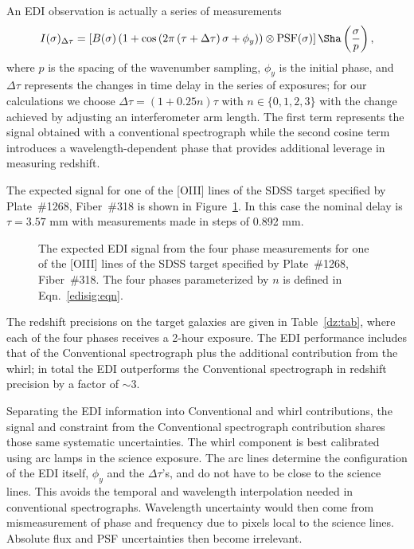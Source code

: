 \documentclass[preprint]{aastex}
\begin{document}
An EDI observation is actually a series of measurements
\begin{equation}
I(\sigma)_{\Delta\tau} = \left[B(\sigma)\left(1+\cos{\left(2\pi\left(\tau+\Delta \tau\right)\sigma+\phi_y \right)} \right)\otimes \mbox{PSF}(\sigma)\right]\Sha\left(\frac{\sigma}{p}\right),
\label{edisig:eqn}
\end{equation}
where $p$ is the spacing of the wavenumber sampling, $\phi_y$ is the initial phase,
and $\Delta \tau$ represents the changes in time delay in the series of exposures; for our calculations we choose  $\Delta \tau = (1+0.25n)\tau $ with $n\in\{0,1,2,3\}$
with the change achieved by adjusting an interferometer arm length.
The first term represents the signal obtained with a conventional spectrograph while the second cosine term
introduces a wavelength-dependent phase that provides additional leverage in measuring redshift.


The expected signal for one of the [OIII] lines of the SDSS target specified by Plate~\#1268, Fiber~\#318 is shown
in Figure~\ref{edicounts:fig}.   In this case the nominal delay is $\tau = 3.57$ mm with measurements
made in steps of 0.892 mm.


\begin{figure}[t]
   \centering
   \caption{The expected EDI signal from the four phase measurements for one of the [OIII] lines of
   the SDSS target specified by Plate~\#1268, Fiber~\#318.
   The four phases parameterized by $n$ is defined in Eqn.~\ref{edisig:eqn}.\label{edicounts:fig}}
\end{figure}


The redshift precisions on the target galaxies are given in Table~\ref{dz:tab}, where each of the four phases receives
a 2-hour exposure.  The EDI performance includes that of the Conventional spectrograph plus
the additional contribution from the whirl; in total the EDI outperforms the Conventional spectrograph
in redshift precision by a factor of $\sim 3$.

Separating the EDI information into Conventional and whirl contributions,
the signal and constraint from the Conventional spectrograph contribution shares those same systematic uncertainties.
The whirl component is best calibrated using arc lamps in the science exposure.  The arc lines determine the configuration
of the EDI itself, $\phi_y$ and the $\Delta \tau$'s, and do not have to be close
to the science lines.  This avoids the temporal and wavelength interpolation needed in conventional spectrographs.
Wavelength uncertainty would then come from mismeasurement of phase and frequency due to pixels local to the
science lines. Absolute flux and PSF uncertainties then become irrelevant.
\end{document}
